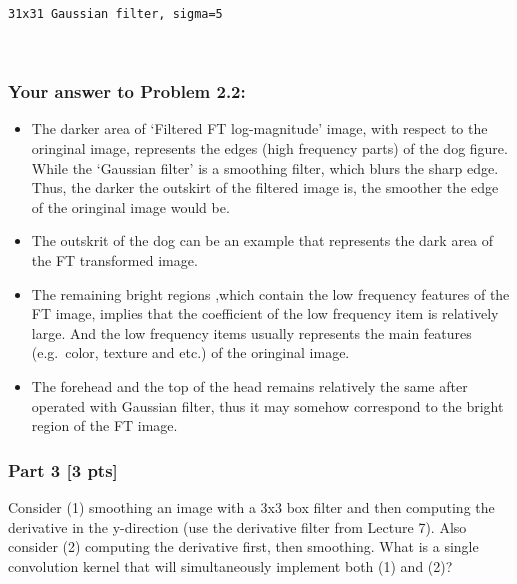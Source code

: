 \documentclass[11pt]{article}
\begin{document}
    \begin{Verbatim}[commandchars=\\\{\}]
31x31 Gaussian filter, sigma=5
\end{Verbatim}

    \begin{center}
    \end{center}
    { \hspace*{\fill} \\}
    
    \hypertarget{your-answer-to-problem-2.2}{%
\subsubsection{Your answer to Problem
2.2:}\label{your-answer-to-problem-2.2}}

\begin{itemize}
\item
  The darker area of `Filtered FT log-magnitude' image, with respect to
  the oringinal image, represents the edges (high frequency parts) of
  the dog figure. While the `Gaussian filter' is a smoothing filter,
  which blurs the sharp edge. Thus, the darker the outskirt of the
  filtered image is, the smoother the edge of the oringinal image would
  be.
\item
  The outskrit of the dog can be an example that represents the dark
  area of the FT transformed image.
\item
  The remaining bright regions ,which contain the low frequency features
  of the FT image, implies that the coefficient of the low frequency
  item is relatively large. And the low frequency items usually
  represents the main features (e.g.~color, texture and etc.) of the
  oringinal image.
\item
  The forehead and the top of the head remains relatively the same after
  operated with Gaussian filter, thus it may somehow correspond to the
  bright region of the FT image.
\end{itemize}

    \hypertarget{part-3-3-pts}{%
\subsubsection{Part 3 {[}3 pts{]}}\label{part-3-3-pts}}

Consider (1) smoothing an image with a 3x3 box filter and then computing
the derivative in the y-direction (use the derivative filter from
Lecture 7). Also consider (2) computing the derivative first, then
smoothing. What is a single convolution kernel that will simultaneously
implement both (1) and (2)?
\end{document}
